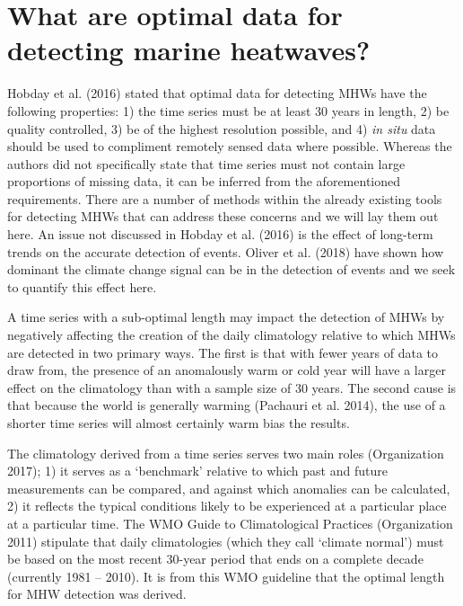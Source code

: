 \documentclass[utf8]{frontiersSCNS} %
\begin{document}
\hypertarget{what-are-optimal-data-for-detecting-marine-heatwaves}{%
\section{What are optimal data for detecting marine
heatwaves?}\label{what-are-optimal-data-for-detecting-marine-heatwaves}}

Hobday et al. (2016) stated that optimal data for detecting MHWs have
the following properties: 1) the time series must be at least 30 years
in length, 2) be quality controlled, 3) be of the highest resolution
possible, and 4) \emph{in situ} data should be used to compliment
remotely sensed data where possible. Whereas the authors did not
specifically state that time series must not contain large proportions
of missing data, it can be inferred from the aforementioned
requirements. There are a number of methods within the already existing
tools for detecting MHWs that can address these concerns and we will lay
them out here. An issue not discussed in Hobday et al. (2016) is the
effect of long-term trends on the accurate detection of events. Oliver
et al. (2018) have shown how dominant the climate change signal can be
in the detection of events and we seek to quantify this effect here.

A time series with a sub-optimal length may impact the detection of MHWs
by negatively affecting the creation of the daily climatology relative
to which MHWs are detected in two primary ways. The first is that with
fewer years of data to draw from, the presence of an anomalously warm or
cold year will have a larger effect on the climatology than with a
sample size of 30 years. The second cause is that because the world is
generally warming (Pachauri et al. 2014), the use of a shorter time
series will almost certainly warm bias the results.

The climatology derived from a time series serves two main roles
(Organization 2017); 1) it serves as a `benchmark' relative to which
past and future measurements can be compared, and against which
anomalies can be calculated, 2) it reflects the typical conditions
likely to be experienced at a particular place at a particular time. The
WMO Guide to Climatological Practices (Organization 2011) stipulate that
daily climatologies (which they call `climate normal') must be based on
the most recent 30-year period that ends on a complete decade (currently
1981 -- 2010). It is from this WMO guideline that the optimal length for
MHW detection was derived.
\end{document}

